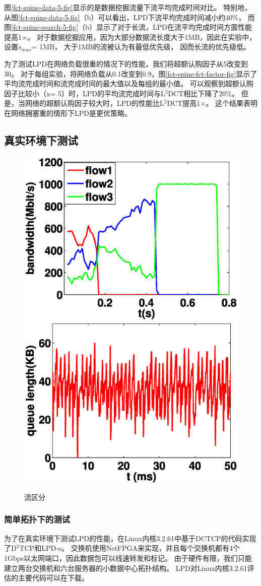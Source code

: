 图\ref{fct-spine-data-5-fig}显示的是数据挖掘流量下流平均完成时间对比。
特别地，从图\ref{fct-spine-data-5-fig}（b）可以看出，LPD下流平均完成时间减小约$40\%$，
而图\ref{fct-spine-search-5-fig}（b）显示了对于长流，LPD在流平均完成时间方面性能提高1$\times$。
对于数据挖掘应用，因为大部分数据流长度大于1MB，因此在实验中，设置$s_{max }$= 1MB，
大于1MB的流被认为有最低优先级，
因而长流的优先级低。

为了测试LPD在网络负载很重的情况下的性能，我们将超额认购因子从5改变到30。
对于每组实验，将网络负载从0.1改变到0.9，图\ref{fct-spine-fct-factor-fig}显示了平均流完成时间和流完成时间的最大值以及每组的最小值。
可以观察到超额认购因子比较小（x= 5）时，LPD的平均流完成时间与L$^2$DCT相比下降了$20\%$。
但是，当网络的超额认购因子较大时，LPD的性能比L$^2$DCT提高1$\times$。
这个结果表明在网络拥塞重的情形下LPD是更优策略。


\subsection{真实环境下测试}


\begin{figure}[h]
\centering
{}
 {\includegraphics[width=0.45\columnwidth]{figures/LPD/Realtest/realbandwidth2.eps}}
{\includegraphics[width=0.45\columnwidth]{figures/LPD/Realtest/realqueue2.eps}}
\caption{流区分}
\label{real-fig}
\end{figure}


\subsubsection{简单拓扑下的测试}
为了在真实环境下测试LPD的性能，在Linux内核3.2.61中基于DCTCP的代码实现了D$^2$TCP和LPD-e。
交换机使用NetFPGA来实现，并且每个交换机都有4个1Gbps以太网端口，因此数据包可以线速转发和标记。
由于硬件有限，我们只能建立两台交换机和六台服务器的小数据中心拓扑结构。
LPD对Linux内核3.2.61评估的主要代码可以在\cite{LPD-code}下载。


